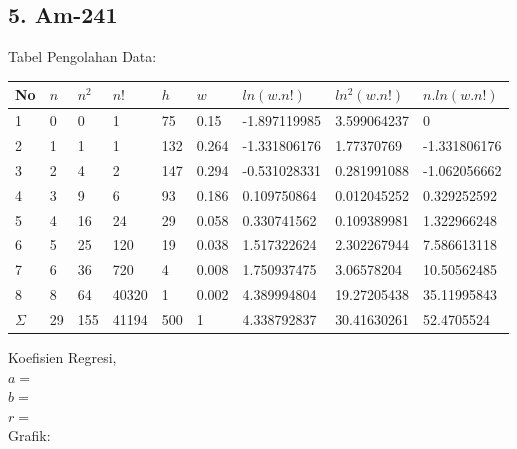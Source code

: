 \documentclass{article}
\begin{document}
			\subsection*{5. Am-241}
			Tabel Pengolahan Data:
			\begin{longtable}{@{}lllllllll@{}}
				\toprule
				No  & $n$  & $n^{2}$ & $n!$   & $h$   & $w$     & $ln(w.n!)$     & $ln^{2}(w.n!)$ & $n.ln(w.n!)$   \\ \midrule
				\endfirsthead
				\endhead
				\bottomrule
				\endfoot
				\endlastfoot
				1   & 0  & 0                    & 1     & 75  & 0.15  & -1.897119985 & 3.599064237                 & 0            \\
				2   & 1  & 1                    & 1     & 132 & 0.264 & -1.331806176 & 1.77370769                  & -1.331806176 \\
				3   & 2  & 4                    & 2     & 147 & 0.294 & -0.531028331 & 0.281991088                 & -1.062056662 \\
				4   & 3  & 9                    & 6     & 93  & 0.186 & 0.109750864  & 0.012045252                 & 0.329252592  \\
				5   & 4  & 16                   & 24    & 29  & 0.058 & 0.330741562  & 0.109389981                 & 1.322966248  \\
				6   & 5  & 25                   & 120   & 19  & 0.038 & 1.517322624  & 2.302267944                 & 7.586613118  \\
				7   & 6  & 36                   & 720   & 4   & 0.008 & 1.750937475  & 3.06578204                  & 10.50562485  \\
				8   & 8  & 64                   & 40320 & 1   & 0.002 & 4.389994804  & 19.27205438                 & 35.11995843  \\* \midrule
				$\Sigma$ & 29 & 155                  & 41194 & 500 & 1     & 4.338792837  & 30.41630261                 & 52.4705524   \\* \bottomrule
			\end{longtable}
			\hspace{-0.6cm}Koefisien Regresi, \\
			$a = $ \\
			$b = $ \\
			$r = $ \\
			Grafik: 
\end{document}

